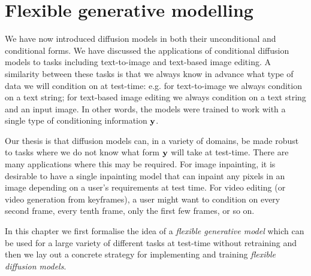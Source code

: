 \chapter{Flexible generative modelling}
\label{ch:flexible-diffusion}



We have now introduced diffusion models in both their unconditional and conditional forms. We have discussed the applications of conditional diffusion models to tasks including text-to-image and text-based image editing. A similarity between these tasks is that we always know in advance what type of data we will condition on at test-time: e.g. for text-to-image we always condition on a text string; for text-based image editing we always condition on a text string and an input image. In other words, the models were trained to work with a single type of conditioning information ${\mathbf{y}}$.

Our thesis is that diffusion models can, in a variety of domains, be made robust to tasks where we do not know what form ${\mathbf{y}}$ will take at test-time. There are many applications where this may be required. For image inpainting, it is desirable to have a single inpainting model that can inpaint any pixels in an image depending on a user's requirements at test time. For video editing (or video generation from keyframes), a user might want to condition on every second frame, every tenth frame, only the first few frames, or so on.


In this chapter we first formalise the idea of a \textit{flexible generative model} which can be used for a large variety of different tasks at test-time without retraining and then we lay out a concrete strategy for implementing and training \textit{flexible diffusion models}.

